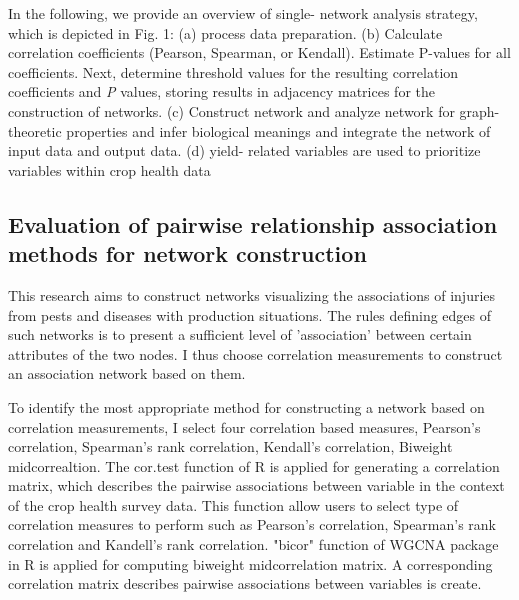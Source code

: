 In the following, we provide an overview of single- network analysis strategy, which is depicted in Fig. 1: (a) process data preparation. (b) Calculate correlation coefficients (Pearson, Spearman, or Kendall). Estimate P-values for all coefficients. Next, determine threshold values for the resulting correlation coefficients and \textit{P} values, storing results in adjacency matrices for the construction of networks. (c) Construct network and analyze network for graph-theoretic properties and infer biological meanings and integrate the network of input data and output data. (d) yield- related variables are used to prioritize variables within crop health data

\subsection*{Evaluation of pairwise relationship association methods for network construction}

This research aims to construct networks visualizing the associations of injuries from pests and diseases with production situations. The rules defining edges of such networks is to present a sufficient level of 'association' between certain attributes of the two nodes. I thus choose correlation measurements to construct an association network based on them.


To identify the most appropriate method for constructing a network based on correlation measurements, I select four correlation based measures, Pearson's correlation, Spearman's rank correlation, Kendall's correlation, Biweight midcorrealtion. The cor.test function of R  is applied for generating a correlation matrix, which describes the pairwise associations between variable in the context of the crop health survey data. This function allow users to select type of correlation measures to perform such as Pearson's correlation, Spearman's rank correlation and Kandell's rank correlation. "bicor" function of WGCNA package  in R is applied for computing biweight midcorrelation matrix. A corresponding correlation matrix describes pairwise associations between variables is create. %

